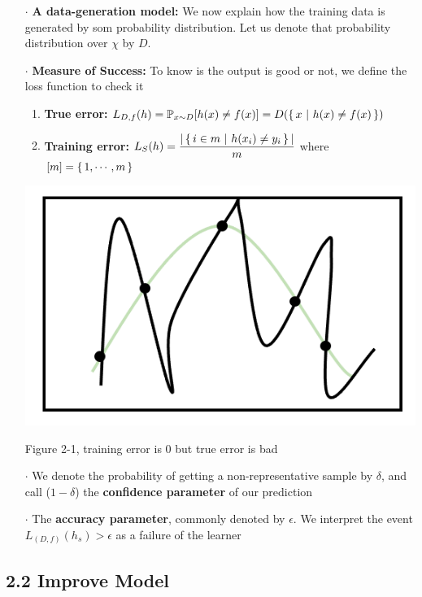 \begin{enumerate}
	\item[$\cdot$] \textbf{A data-generation model:} We now explain how the training data is generated by som probability distribution. Let us denote that probability distribution over $\chi$ by $D$.
	\item[$\cdot$] \textbf{Measure of Success:} To know is the output is good or not, we define the loss function to check it
	\begin{enumerate}
		\item \textbf{True error:} $L_{D,f}(h) = \mathbb{P}_{x\sim D}[h(x) \neq f(x)] = D(\left\{ \,x ~|~ h(x) \neq f(x) \,\right\})$
		\item \textbf{Training error:} $L_S(h) = \dfrac{|\left\{ \,i \in m ~|~ h(x_i) \neq y_i \,\right\} |}{m}$ where $[m] = \left\{ \,1,\cdots,m \,\right\}$
	\end{enumerate}
	
	\begin{center}
		\includegraphics[scale = 0.3]{./figure/2-1.png}
		
		Figure 2-1, training error is $0$ but true error is bad
	\end{center}
	
	
	\item[$\cdot$] We denote the probability of getting a non-representative sample by $\delta$, and call ($1 - \delta$) the \textbf{confidence parameter} of our prediction
	\item[$\cdot$] The \textbf{accuracy parameter}, commonly denoted by $\epsilon$. We interpret the event $L_{(D,f)}(h_s) > \epsilon$ as a failure of the learner
\end{enumerate}

\newpage

\subsection*{2.2 Improve Model} $ $\\

